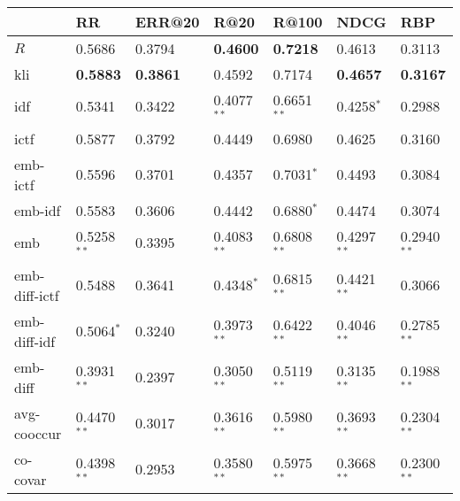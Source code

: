 \begin{tabular}{lllllll}
\toprule
{} &               RR &           ERR@20 &             R@20 &            R@100 &             NDCG &              RBP \\
\midrule
$R$           &           0.5686 &           0.3794 &  \textbf{0.4600} &  \textbf{0.7218} &           0.4613 &           0.3113 \\
kli           &  \textbf{0.5883} &  \textbf{0.3861} &           0.4592 &           0.7174 &  \textbf{0.4657} &  \textbf{0.3167} \\
idf           &           0.5341 &           0.3422 &    0.4077$^{**}$ &    0.6651$^{**}$ &     0.4258$^{*}$ &           0.2988 \\
ictf          &           0.5877 &           0.3792 &           0.4449 &           0.6980 &           0.4625 &           0.3160 \\
emb-ictf      &           0.5596 &           0.3701 &           0.4357 &     0.7031$^{*}$ &           0.4493 &           0.3084 \\
emb-idf       &           0.5583 &           0.3606 &           0.4442 &     0.6880$^{*}$ &           0.4474 &           0.3074 \\
emb           &    0.5258$^{**}$ &           0.3395 &    0.4083$^{**}$ &    0.6808$^{**}$ &    0.4297$^{**}$ &    0.2940$^{**}$ \\
emb-diff-ictf &           0.5488 &           0.3641 &     0.4348$^{*}$ &    0.6815$^{**}$ &    0.4421$^{**}$ &           0.3066 \\
emb-diff-idf  &     0.5064$^{*}$ &           0.3240 &    0.3973$^{**}$ &    0.6422$^{**}$ &    0.4046$^{**}$ &    0.2785$^{**}$ \\
emb-diff      &    0.3931$^{**}$ &           0.2397 &    0.3050$^{**}$ &    0.5119$^{**}$ &    0.3135$^{**}$ &    0.1988$^{**}$ \\
avg-cooccur   &    0.4470$^{**}$ &           0.3017 &    0.3616$^{**}$ &    0.5980$^{**}$ &    0.3693$^{**}$ &    0.2304$^{**}$ \\
co-covar      &    0.4398$^{**}$ &           0.2953 &    0.3580$^{**}$ &    0.5975$^{**}$ &    0.3668$^{**}$ &    0.2300$^{**}$ \\
\bottomrule
\end{tabular}
